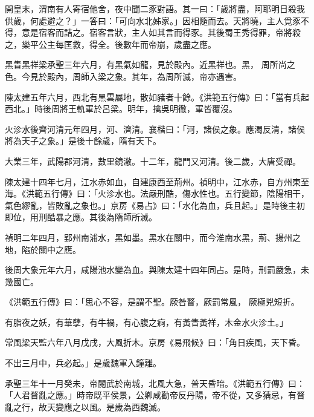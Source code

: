 \begin{pinyinscope}
 開皇末，渭南有人寄宿他舍，夜中聞二豕對語。其一曰：「歲將盡，阿耶明日殺我供歲，何處避之？」一答曰：「可向水北姊家。」因相隨而去。天將曉，主人覓豕不得，意是宿客而詰之。宿客言狀，主人如其言而得豕。其後蜀王秀得罪，帝將殺之，樂平公主每匡救，得全。後數年而帝崩，歲盡之應。



 黑眚黑祥梁承聖三年六月，有黑氣如龍，見於殿內。近黑祥也。黑，
 周所尚之色。今見於殿內，周師入梁之象。其年，為周所滅，帝亦遇害。



 陳太建五年六月，西北有黑雲屬地，散如豬者十餘。《洪範五行傳》曰：「當有兵起西北。」時後周將王軌軍於呂梁。明年，擒吳明徹，軍皆覆沒。



 火沴水後齊河清元年四月，河、濟清。襄楷曰：「河，諸侯之象。應濁反清，諸侯將為天子之象。」是後十餘歲，隋有天下。



 大業三年，武陽郡河清，數里鏡澈。十二年，龍門又河清。後二歲，大唐受禪。



 陳太建十四年七月，江水赤如血，自建康西至荊州。禎明中，江水赤，自方州東至海。《洪範五行傳》曰：「火沴水也。法嚴刑酷，傷水性也。五行變節，陰陽相干，氣色繆亂，皆敗亂之象也。」京房《易占》曰：「水化為血，兵且起。」是時後主初即位，用刑酷暴之應。其後為隋師所滅。



 禎明二年四月，郢州南浦水，黑如墨。黑水在關中，而今淮南水黑，荊、揚州之地，陷於關中之應。



 後周大象元年六月，咸陽池水變為血。與陳太建十四年同占。是時，刑罰嚴急，未幾國亡。



 《洪範五行傳》曰：「思心不容，是謂不聖。厥咎瞀，厥罰常風，
 厥極兇短折。



 有脂夜之妖，有華孽，有牛禍，有心腹之痾，有黃眚黃祥，木金水火沴土。」



 常風梁天監六年八月戊戌，大風折木。京房《易飛候》曰：「角日疾風，天下昏。



 不出三月中，兵必起。」是歲魏軍入鐘離。



 承聖三年十一月癸未，帝閱武於南城，北風大急，普天昏暗。《洪範五行傳》曰：「人君瞀亂之應。」時帝既平侯景，公卿咸勸帝反丹陽，帝不從，又多猜忌，有瞀亂之行，故天變應之以風。是歲為西魏滅。




\end{pinyinscope}
